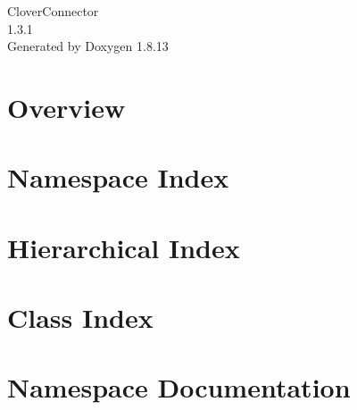 \documentclass[twoside]{book}
\newcommand{\+}{\discretionary{\mbox{\scriptsize$\hookleftarrow$}}{}{}}
\newcommand{\clearemptydoublepage}{%
  \newpage{\pagestyle{empty}\cleardoublepage}%
}
\begin{document}
\hypersetup{pageanchor=false,
             bookmarksnumbered=true,
             pdfencoding=unicode
            }
\begin{titlepage}
\vspace*{7cm}
\begin{center}%
{\Large Clover\+Connector \\[1ex]\large 1.\+3.\+1 }\\
\vspace*{1cm}
{\large Generated by Doxygen 1.8.13}\\
\end{center}
\end{titlepage}
\clearemptydoublepage
{}
\tableofcontents
\clearemptydoublepage
{}
\hypersetup{pageanchor=true}

\chapter{Overview}
\label{index}\hypertarget{index}{}
\chapter{Namespace Index}

\chapter{Hierarchical Index}

\chapter{Class Index}

\chapter{Namespace Documentation}

















\end{document}
